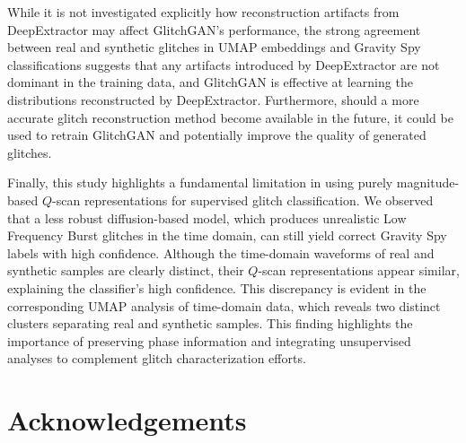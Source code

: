 \documentclass[reprint,nofootinbib,amsmath,amssymb,aps,floatfix]{revtex4-2}
\begin{document}
While it is not investigated explicitly how reconstruction artifacts from DeepExtractor may affect GlitchGAN's performance, the strong agreement between real and synthetic glitches in UMAP embeddings and Gravity Spy classifications suggests that any artifacts introduced by DeepExtractor are not dominant in the training data, and GlitchGAN is effective at learning the distributions reconstructed by DeepExtractor.
Furthermore, should a more accurate glitch reconstruction method become available in the future, it could be used to retrain GlitchGAN and potentially improve the quality of generated glitches.

Finally, this study highlights a fundamental limitation in using purely magnitude-based $Q$-scan representations for supervised glitch classification.
We observed that a less robust diffusion-based model, which produces unrealistic Low Frequency Burst glitches in the time domain, can still yield correct Gravity Spy labels with high confidence.
Although the time-domain waveforms of real and synthetic samples are clearly distinct, their $Q$-scan representations appear similar, explaining the classifier’s high confidence.
This discrepancy is evident in the corresponding UMAP analysis of time-domain data, which reveals two distinct clusters separating real and synthetic samples.
This finding highlights the importance of preserving phase information and integrating unsupervised analyses to complement glitch characterization efforts.


\section*{Acknowledgements}

\end{document}
